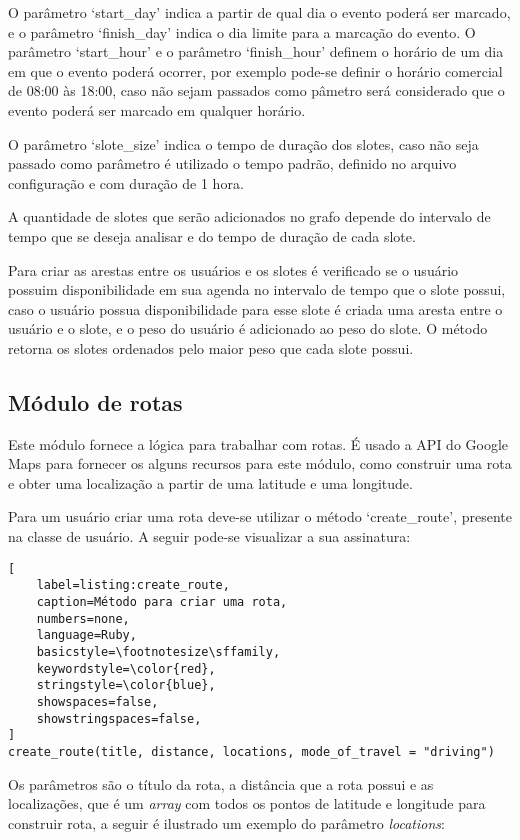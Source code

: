 O parâmetro `start\_day' indica a partir de qual dia o evento poderá ser marcado, e o parâmetro `finish\_day' indica o dia limite para a marcação do evento. O parâmetro `start\_hour' e o parâmetro `finish\_hour' definem o horário de um dia em que o evento poderá ocorrer, por exemplo pode-se definir o horário comercial de 08:00 às 18:00, caso não sejam passados como pâmetro será considerado que o evento poderá ser marcado em qualquer horário.

O parâmetro `slote\_size' indica o tempo de duração dos slotes, caso não seja passado como parâmetro é utilizado o tempo padrão, definido no arquivo configuração e com duração de 1 hora.

A quantidade de slotes que serão adicionados no grafo depende do intervalo de tempo que se deseja analisar e do tempo de duração de cada slote.

Para criar as arestas entre os usuários e os slotes é verificado se o usuário possuim disponibilidade em sua agenda no intervalo de tempo que o slote possui, caso o usuário possua disponibilidade para esse slote é criada uma aresta entre o usuário e o slote, e o peso do usuário é adicionado ao peso do slote. O método retorna os slotes ordenados pelo maior peso que cada slote possui.

\subsection{Módulo de rotas}

Este módulo fornece a lógica para trabalhar com rotas. É usado a API do Google Maps para fornecer os alguns recursos para este módulo, como construir uma rota e obter uma localização a partir de uma latitude e uma longitude.

Para um usuário criar uma rota deve-se utilizar o método `create\_route', presente na classe de usuário. A seguir pode-se visualizar a sua assinatura:

\begin{lstlisting}[
    label=listing:create_route,
    caption=Método para criar uma rota,
    numbers=none,
    language=Ruby,
    basicstyle=\footnotesize\sffamily,
    keywordstyle=\color{red},
    stringstyle=\color{blue},
    showspaces=false,
    showstringspaces=false,
]
create_route(title, distance, locations, mode_of_travel = "driving")
\end{lstlisting}


Os parâmetros são o título da rota, a distância que a rota possui e as localizações, que é um \textit{array} com todos os pontos de latitude e longitude para construir rota, a seguir é ilustrado um exemplo do parâmetro \textit{locations}:


